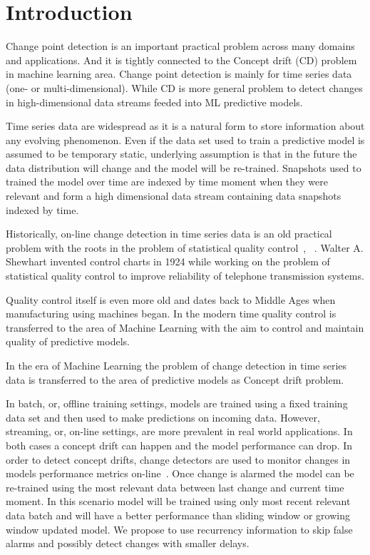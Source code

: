\chapter{Introduction}

Change point detection is an important practical problem across many domains and applications.
And it is tightly connected to the Concept drift (CD) problem in machine learning area.
Change point detection is mainly for time series data (one- or multi-dimensional).
While CD is more general problem to detect changes in high-dimensional data streams feeded into ML predictive models.

Time series data are widespread as it is a natural form to store information about any evolving phenomenon.
Even if the data set used to train a predictive model is assumed to be temporary static, underlying assumption is that in the future the data distribution will change and the model will be re-trained. Snapshots used to trained the model over time are indexed by time moment when they were relevant and form a high dimensional data stream containing data snapshots indexed by time.

Historically, on-line change detection in time series data is an old practical problem with the roots in the problem of statistical quality control~\cite{basseville1993detection}, ~\cite{NISTbook}. Walter A. Shewhart invented control charts in 1924 while working on the problem of statistical quality control to improve reliability of telephone transmission systems.

Quality control itself is even more old and dates back to Middle Ages when manufacturing using machines began.
In the modern time quality control is transferred to the area of Machine Learning with the aim to control and maintain quality of predictive models.

In the era of Machine Learning the problem of change detection in time series data is transferred to the area of predictive models as Concept drift problem.

In batch, or, offline training settings, models are trained using a fixed training data set and then used to make predictions on incoming data. 
However, streaming, or, on-line settings, are more prevalent in real world applications. 
In both cases a concept drift can happen and the model performance can drop. 
In order to detect concept drifts, change detectors are used to monitor changes in models performance metrics on-line~\cite{gama2004learning}. 
Once change is alarmed the model can be re-trained using the most relevant data between last change and current time moment.
In this scenario model will be trained using only most recent relevant data batch and will have a better performance than sliding window or growing window updated model.
We propose to use recurrency information to skip false alarms and possibly detect changes with smaller delays.

